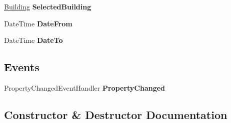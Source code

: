 \begin{DoxyCompactItemize}
\item 
\hypertarget{class_baudi_1_1_client_1_1_view_models_1_1_tabs_view_models_1_1_reports_tab_view_model_a017179cc2f1ab1abe8557b662cf93a91}{}\hyperlink{class_baudi_1_1_d_a_l_1_1_models_1_1_building}{Building} {\bfseries Selected\+Building}\label{class_baudi_1_1_client_1_1_view_models_1_1_tabs_view_models_1_1_reports_tab_view_model_a017179cc2f1ab1abe8557b662cf93a91}

\item 
\hypertarget{class_baudi_1_1_client_1_1_view_models_1_1_tabs_view_models_1_1_reports_tab_view_model_a85edd5ca5ae64fe246571881ef72df22}{}Date\+Time {\bfseries Date\+From}\label{class_baudi_1_1_client_1_1_view_models_1_1_tabs_view_models_1_1_reports_tab_view_model_a85edd5ca5ae64fe246571881ef72df22}

\item 
\hypertarget{class_baudi_1_1_client_1_1_view_models_1_1_tabs_view_models_1_1_reports_tab_view_model_a109a2a7f0798b45b8430dd1c6e37891f}{}Date\+Time {\bfseries Date\+To}\label{class_baudi_1_1_client_1_1_view_models_1_1_tabs_view_models_1_1_reports_tab_view_model_a109a2a7f0798b45b8430dd1c6e37891f}

\end{DoxyCompactItemize}
\subsection*{Events}
\begin{DoxyCompactItemize}
\item 
\hypertarget{class_baudi_1_1_client_1_1_view_models_1_1_tabs_view_models_1_1_reports_tab_view_model_afbe51e86e72ae3174577018b740750d6}{}Property\+Changed\+Event\+Handler {\bfseries Property\+Changed}\label{class_baudi_1_1_client_1_1_view_models_1_1_tabs_view_models_1_1_reports_tab_view_model_afbe51e86e72ae3174577018b740750d6}

\end{DoxyCompactItemize}


\subsection{Constructor \& Destructor Documentation}
\hypertarget{class_baudi_1_1_client_1_1_view_models_1_1_tabs_view_models_1_1_reports_tab_view_model_a5fddbeb94b8f899cc40c938b4cf04ff8}{}
